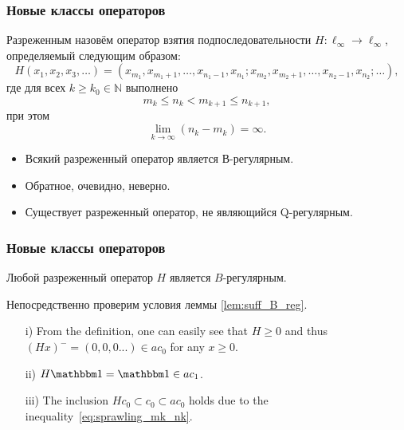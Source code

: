 \begin{frame}\frametitle{{Новые классы операторов}}
	\vfill
	\begin{ddefinition}
		Разреженным назовём оператор
		взятия подпоследовательности
		$H: \ell_\infty \to \ell_\infty$,
		определяемый следующим образом:
		$$
		H(x_1, x_2, x_3, \ldots) = (x_{m_1}, x_{m_1 + 1}, \ldots, x_{n_1 - 1}, x_{n_1};
		x_{m_2}, x_{m_2 + 1}, \ldots, x_{n_2 - 1}, x_{n_2}; \ldots),
		$$
		где для всех
		$k \geqslant k_0 \in \mathbb N$
		выполнено
		\begin{equation} \label{eq:sprawling_mk_nk}
		m_k \leqslant n_k < m_{k+1}\leqslant n_{k+1},
	    \end{equation}
		при этом
		$$
		\lim\limits_{k \to \infty} (n_k - m_k) = \infty
		.
		$$

		\begin{itemize}
			\item
				Всякий разреженный оператор является В-регулярным.
			\item
				Обратное, очевидно, неверно.
			\item
				Существует разреженный оператор, не являющийся Q-регулярным.
		\end{itemize}
	\end{ddefinition}
	\vfill
\end{frame}

\begin{frame}\frametitle{{Новые классы операторов}}
	\begin{ttheorem}
		\label{thm:sprawling_is_B-regular}
		Любой разреженный оператор $H$ является $B$-регулярным.
	\end{ttheorem}

		Непосредственно проверим условия леммы \ref{lem:suff_B_reg}.
		\begin{enumerate}
			\item[i)] From the definition, one can easily see that $H\geq 0$
			and thus $(Hx)^- = (0,0,0...)\in ac_0$ for any $x\geq 0$.
			\item[ii)] $H \one = \one \in ac_1$.
			\item[iii)] The inclusion $Hc_0 \subset c_0 \subset ac_0$ holds due to the inequality~\eqref{eq:sprawling_mk_nk}.
		\end{enumerate}
\end{frame}

